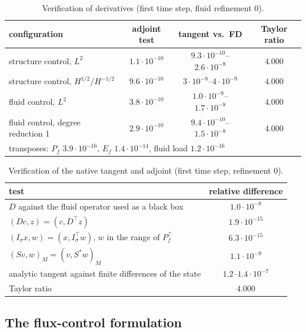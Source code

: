 \documentclass[11pt,a4paper]{article}
\theoremstyle{definition}
\theoremstyle{remark}
\newcommand{\M}{M}
\begin{document}
\begin{table}[ht]\centering
\caption{Verification of derivatives (first time step, fluid refinement 0).}\label{tab:verification}
\begin{tabular}{lccc}
\toprule
configuration & adjoint test & tangent vs.\ FD & Taylor ratio\\
\midrule
structure control, $L^2$ & $1.1\cdot10^{-10}$ & $9.3\cdot10^{-10}$--$2.6\cdot10^{-8}$ & $4.000$\\
structure control, $H^{1/2}/H^{-1/2}$ & $9.6\cdot10^{-10}$ & $3\cdot10^{-8}$--$4\cdot10^{-9}$ & $4.000$\\
fluid control, $L^2$ & $3.8\cdot10^{-10}$ & $1.0\cdot10^{-9}$--$1.7\cdot10^{-8}$ & $4.000$\\
fluid control, degree reduction 1 & $2.9\cdot10^{-10}$ & $9.4\cdot10^{-10}$--$1.5\cdot10^{-8}$ & $4.000$\\
\midrule
\multicolumn{4}{l}{transposes: $P_f$ $3.9\cdot10^{-16}$, $E_f$ $1.4\cdot10^{-14}$, fluid load $1.2\cdot10^{-16}$}\\
\bottomrule
\end{tabular}
\end{table}


\begin{table}[ht]\centering
\caption{Verification of the native tangent and adjoint (first time step, refinement 0).}
\label{tab:native_verification}
\begin{tabular}{lc}
\toprule
test & relative difference\\
\midrule
$D$ against the fluid operator used as a black box & $1.0\cdot10^{-8}$\\
$(Dc,z) = (c,D^{\top}z)$ & $1.9\cdot10^{-15}$\\
$(I_\sigma x,w) = (x,I_\sigma^{\top}w)$, $w$ in the range of $P_f^{\top}$ & $6.3\cdot10^{-15}$\\
$(Sv,w)_{\M} = (v,S^*w)_{\M}$ & $1.1\cdot10^{-9}$\\
analytic tangent against finite differences of the state & $1.2$--$1.4\cdot10^{-7}$\\
Taylor ratio & $4.000$\\
\bottomrule
\end{tabular}
\end{table}

\subsection{The flux-control formulation}\label{sec:res_fluxcontrol}
\end{document}
